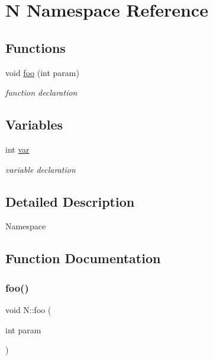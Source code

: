 \hypertarget{namespace_n}{}\section{N Namespace Reference}
\label{namespace_n}
\subsection*{Functions}
\begin{DoxyCompactItemize}
\item 
void \mbox{\hyperlink{namespace_n_a0c776dda1c868f653e020c9ee8dc83bb}{foo}} (int param)
\begin{DoxyCompactList}\small\item\em function declaration \end{DoxyCompactList}\end{DoxyCompactItemize}
\subsection*{Variables}
\begin{DoxyCompactItemize}
\item 
int \mbox{\hyperlink{namespace_n_a406e233433deabc7b1612470373d53e0}{var}}
\begin{DoxyCompactList}\small\item\em variable declaration \end{DoxyCompactList}\end{DoxyCompactItemize}


\subsection{Detailed Description}
Namespace 

\subsection{Function Documentation}
\mbox{\label{namespace_n_a0c776dda1c868f653e020c9ee8dc83bb}} 
\subsubsection{\texorpdfstring{foo()}{foo()}}
{\footnotesize\ttfamily void N\+::foo (\begin{DoxyParamCaption}\item[{int}]{param }\end{DoxyParamCaption})}



